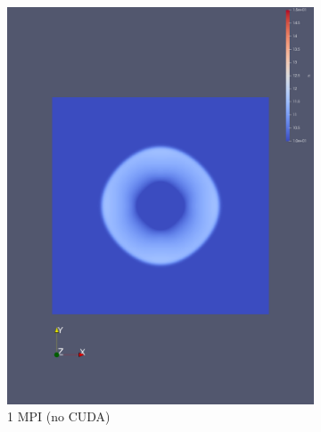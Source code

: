 \documentclass[article]{scrartcl}
\begin{document}
\begin{figure}[htpb]
    \centering
    \begin{subfigure}{.3\textwidth}
        \includegraphics[width=\textwidth,keepaspectratio=true]{../figs/1_validation_cuda_original_1mpi.png}
        \caption{1 MPI (no CUDA)}
        \label{fig:1mpi}
    \end{subfigure}
%
    \begin{subfigure}{.3\textwidth}
    \centering

\end{subfigure}
\end{figure}
\end{document}
